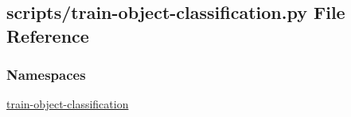 \hypertarget{train-object-classification_8py}{\subsection{scripts/train-\/object-\/classification.py File Reference}
\label{train-object-classification_8py}
}
\subsubsection*{Namespaces}
\begin{DoxyCompactItemize}
\item 
\hyperlink{namespacetrain-object-classification}{train-\/object-\/classification}
\end{DoxyCompactItemize}
